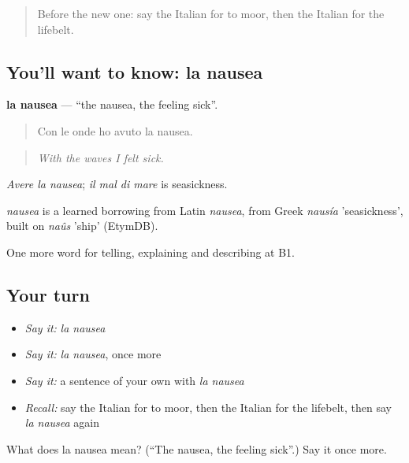 \label{lesson:IT-C424-nausea}



\begin{quote}
Before the new one: say the Italian for to moor, then the Italian for the lifebelt.
\end{quote}

\subsection*{You'll want to know: la nausea}
\textbf{la nausea} — \textquotedblleft{}the nausea, the feeling sick\textquotedblright{}.

\begin{quote}
Con le onde ho avuto la nausea.
\end{quote}

\begin{quote}
\emph{With the waves I felt sick.}
\end{quote}

\emph{Avere la nausea}; \emph{il mal di mare} is seasickness.

\begin{cousinweb}
\emph{nausea} is a learned borrowing from Latin \emph{nausea}, from Greek \emph{nausía} 'seasickness', built on \emph{naûs} 'ship' (EtymDB).
\end{cousinweb}

\begin{grammarlens}[title={What you've built}]
One more word for telling, explaining and describing at B1.
\end{grammarlens}

\subsection*{Your turn}
\begin{itemize}
\raggedright
  \item \emph{Say it:} \emph{la nausea}
  \item \emph{Say it:} \emph{la nausea}, once more
  \item \emph{Say it:} a sentence of your own with \emph{la nausea}
  \item \emph{Recall:} say the Italian for to moor, then the Italian for the lifebelt, then say \emph{la nausea} again
\end{itemize}

\begin{tcolorbox}[breakable,colback=teal!4,colframe=teal!35!black,title={Before you move on}]
What does la nausea mean? (\textquotedblleft{}The nausea, the feeling sick\textquotedblright{}.) Say it once more.
\end{tcolorbox}
